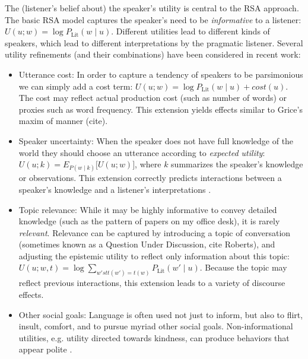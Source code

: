 \documentclass[]{elsarticle}
\begin{document}
The (listener's belief about) the speaker's utility is central to the
RSA approach. The basic RSA model captures the speaker's need to be
\emph{informative} to a listener: $U(u; w) = \log
P_{\text{Lit}}(w\mid u)$. Different utilities lead to different kinds of
speakers, which lead to different interpretations by the pragmatic
listener. Several utility refinements (and their combinations) have been
considered in recent work:

\begin{itemize}
\item
  
  Utterance cost: In order to capture a tendency of speakers to be
  parsimonious we can simply add a cost term: $U(u; w) =
  \log P_{\text{Lit}}(w\mid u) + cost(u)$. The cost may
  reflect actual production cost (such as number of words) or proxies
  such as word frequency. This extension yields effects similar to
  Grice's maxim of manner (cite).
  
\item
  
  Speaker uncertainty: When the speaker does not have full knowledge of
  the world they should choose an utterance according to \emph{expected
  utility}: $U(u;k) = E_{P(w\mid k)}{[}U(u;w){]}$, where $k$
  summarizes the speaker's knowledge or observations. This extension
  correctly predicts interactions between a speaker's knowledge and a
  listener's interpretations
  \cite{goodmanstuhllmueler}.
  
\item
  
  Topic relevance: While it may be highly informative to convey detailed
  knowledge (such as the pattern of papers on my office desk), it is
  rarely \emph{relevant}. Relevance can be captured by introducing a
  topic of conversation (sometimes known as a Question Under Discussion,
  cite Roberts), and adjusting the epistemic utility to reflect only
  information about this topic: $U(u;w,t)=\log \sum_{w' st t(w')=t(w)} P_{\text{Lit}}(w'\mid u)$.
  Because the topic may reflect previous interactions, this extension
  leads to a variety of discourse effects.
  
\item
  
  Other social goals: Language is often used not just to inform, but
  also to flirt, insult, comfort, and to pursue myriad other social
  goals. Non-informational utilities, e.g. utility directed towards
  kindness, can produce behaviors that appear polite
  \cite{yoon}.
  
\end{itemize}
\end{document}
